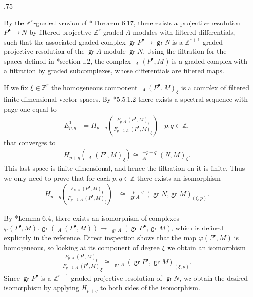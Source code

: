 \documentclass[11pt,fleqn]{article}
\makeatletter
\renewenvironment{proof}[1][\textit{Proof}]{\par
  \pushQED{\qed}%
  \normalfont \topsep.75\paraskip\relax
  \trivlist
  \item[\hskip\labelsep
        \itshape
    #1\@addpunct{.}]\ignorespaces
}{%
  \popQED\endtrivlist\@endpefalse
}
\newcommand\ZZ{\mathbb Z}
\renewcommand\to{\longrightarrow}
\renewcommand\phi{\varphi}
\DeclareMathOperator\GrHom{\underline{\mathsf{Hom}}}
\DeclareMathOperator\GrExt{\underline{\mathsf{Ext}}}
\DeclareMathOperator\gr{\mathsf{gr}}
\makeatother
\begin{document}
\begin{proof}
By the $\ZZ^r$-graded version of \cite{MR}*{Theorem 6.17}, there exists a projective
resolution $P^\bullet \to N$ by filtered projective $\ZZ^r$-graded $A$-modules with
filtered differentials, such that the associated graded complex $\gr P^\bullet \to \gr N$
is a $\ZZ^{r+1}$-graded projective resolution of the $\gr A$-module $\gr N$.
Using the filtration for the $\GrHom$ spaces defined in \cite{VO}*{section I.2}, the
complex $\GrHom_A(P^\bullet, M)$ is a graded complex with a filtration by graded
subcomplexes, whose differentials are filtered maps.

If we fix $\xi \in \ZZ^r$ the homogeneous component $\GrHom_A(P^\bullet, M)_\xi$ is a 
complex of filtered finite dimensional vector spaces. By \cite{W}*{5.5.1.2} there exists 
a spectral sequence with page one equal to
\begin{align*} 
  E_{p,q}^1 
  &= H_{p+q}\left(\frac{F_p \GrHom_A(P^\bullet,M)_\xi}
      {F_{p-1}  \GrHom_A(P^\bullet,M)_\xi}\right) 
    & p,q \in \ZZ,
\end{align*} 
that converges to   
\begin{align*} 
  H_{p+q}(\GrHom_{A}(P^\bullet,M)_\xi) \cong \GrExt^{-p-q}_A(N,M)_\xi.
\end{align*}
This last space is finite dimensional, and hence the filtration on it is finite. Thus 
we only need to prove that for each $p,q \in \ZZ$ there exists an isomorphism
\begin{align*} 
  H_{p+q}\left(\frac{F_p \GrHom_A(P^\bullet,M)_\xi}{F_{p-1} \GrHom_A(P^\bullet,M)_\xi}
  \right) 
    &\cong \GrExt_{\gr A}^{-p-q}(\gr N, \gr M)_{(\xi,p)}.
\end{align*} 

By \cite{VO}*{Lemma 6.4}, there exists an isomorphism of complexes $\phi(P^\bullet, M):
\gr (\GrHom_A(P^\bullet, M)) \to \GrHom_{\gr A}(\gr P^\bullet, \gr M)$, which is defined
explicitly in the reference. Direct inspection shows that the map $\phi(P^\bullet, M)$ 
is homogeneous, so looking at its component of degree $\xi$ we obtain an isomorphism
\begin{align*}
\frac{F_p \GrHom_A(P^\bullet,M)_\xi}{F_{p-1} \GrHom_A(P^\bullet,M)}_\xi \cong 
\GrHom_{\gr A}(\gr P^\bullet, \gr M)_{(\xi,p)}.
\end{align*}
Since $\gr P^\bullet$ is a $\ZZ^{r+1}$-graded projective resolution of $\gr N$, we obtain
the desired isomorphism by applying $H_{p+q}$ to both sides of the isomorphism.
\end{proof}
\end{document}
